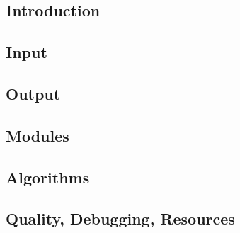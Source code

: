 
\subsection{Introduction}

\subsection{Input}

\subsection{Output}

\subsection{Modules}

\subsection{Algorithms}

\subsection{Quality, Debugging, Resources}

